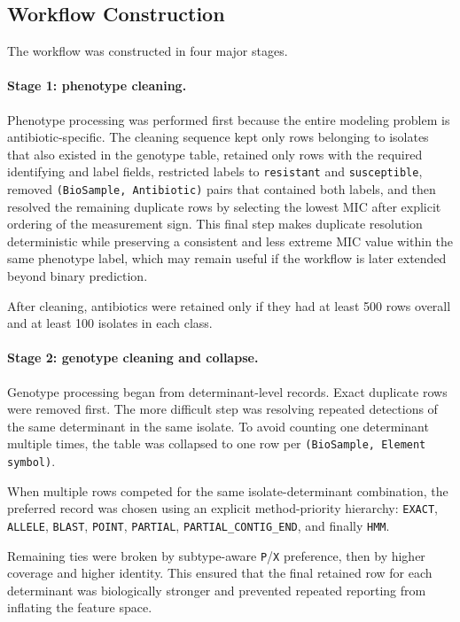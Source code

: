 \subsection{Workflow Construction}

The workflow was constructed in four major stages.

\paragraph{Stage 1: phenotype cleaning.}
Phenotype processing was performed first because the entire modeling problem is antibiotic-specific. The cleaning sequence kept only rows belonging to isolates that also existed in the genotype table, retained only rows with the required identifying and label fields, restricted labels to \texttt{resistant} and \texttt{susceptible}, removed \texttt{(BioSample, Antibiotic)} pairs that contained both labels, and then resolved the remaining duplicate rows by selecting the lowest MIC after explicit ordering of the measurement sign. This final step makes duplicate resolution deterministic while preserving a consistent and less extreme MIC value within the same phenotype label, which may remain useful if the workflow is later extended beyond binary prediction.

After cleaning, antibiotics were retained only if they had at least 500 rows overall and at least 100 isolates in each class.

\paragraph{Stage 2: genotype cleaning and collapse.}
Genotype processing began from determinant-level records. Exact duplicate rows were removed first. The more difficult step was resolving repeated detections of the same determinant in the same isolate. To avoid counting one determinant multiple times, the table was collapsed to one row per \texttt{(BioSample, Element symbol)}.

When multiple rows competed for the same isolate-determinant combination, the preferred record was chosen using an explicit method-priority hierarchy: \texttt{EXACT}, \texttt{ALLELE}, \texttt{BLAST}, \texttt{POINT}, \texttt{PARTIAL}, \texttt{PARTIAL\_CONTIG\_END}, and finally \texttt{HMM}.

Remaining ties were broken by subtype-aware \texttt{P}/\texttt{X} preference, then by higher coverage and higher identity. This ensured that the final retained row for each determinant was biologically stronger and prevented repeated reporting from inflating the feature space.

